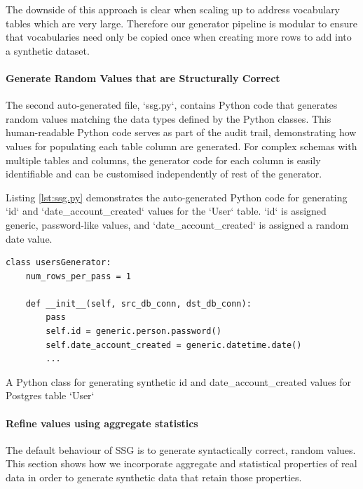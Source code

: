 \documentclass[11pt]{article}
\begin{document}
The downside of this approach is clear when scaling up to address vocabulary tables which are very large. Therefore our generator pipeline is modular to ensure that vocabularies need only be copied once when creating more rows to add into a synthetic dataset. 

\paragraph{Generate Random Values that are Structurally Correct}

The second auto-generated file, `ssg.py`, contains Python code that generates random values matching the data types defined by the Python classes. This human-readable Python code serves as part of the audit trail, demonstrating how values for populating each table column are generated. For complex schemas with multiple tables and columns, the generator code for each column is easily identifiable and can be customised independently of rest of the generator. 

Listing \ref{lst:ssg.py} demonstrates the auto-generated Python code for generating `id` and `date\_account\_created` values for the `User` table. `id` is assigned generic, password-like values, and `date\_account\_created` is assigned a random date value.

\begin{listing}[H]
\begin{verbatim}
class usersGenerator:
    num_rows_per_pass = 1

    def __init__(self, src_db_conn, dst_db_conn):
        pass
        self.id = generic.person.password()
        self.date_account_created = generic.datetime.date()
        ...
\end{verbatim}
\caption{A Python class for generating synthetic id and date\_account\_created values for Postgres table `User`}
\label{lst:ssg.py}
\end{listing}

\paragraph{Refine values using aggregate statistics}

The default behaviour of SSG is to generate syntactically correct, random values. This section shows how we incorporate aggregate and statistical properties of real data in order to generate synthetic data that retain those properties. 
\end{document}
